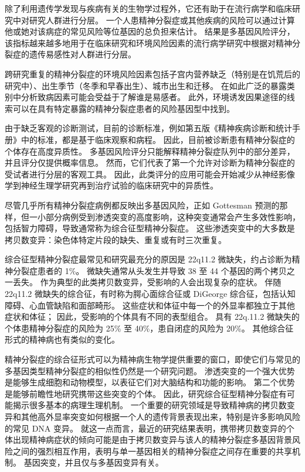 除了利用遗传学发现与疾病有关的生物学过程外，它还有助于在流行病学和临床研究中对研究人群进行分层。
一个人患精神分裂症或其他疾病的风险可以通过计算他或她对该病症的常见风险等位基因的总负担来估计。
结果是多基因风险评分，该指标越来越多地用于在临床研究和环境风险因素的流行病学研究中根据对精神分裂症的遗传易感性对人群进行分层。


跨研究重复的精神分裂症的环境风险因素包括子宫内营养缺乏（特别是在饥荒后的研究中）、出生季节（冬季和早春出生）、城市出生和迁移。
在如此广泛的暴露类别中分析致病因素可能会受益于了解谁是易感者。
此外，环境诱发因果途径的线索可以在具有特定暴露的精神分裂症患者的风险基因型中找到。


由于缺乏客观的诊断测试，目前的诊断标准，例如第五版《精神疾病诊断和统计手册》中的标准，都是基于临床观察和病程。
因此，目前被诊断患有精神分裂症的个体存在高度异质性。
多基因风险评分只能解释精神分裂症队列中的部分差异，并且评分仅提供概率信息。
然而，它们代表了第一个允许对诊断为精神分裂症的受试者进行分层的客观工具。
因此，此类评分的应用可能会开始减少从神经影像学到神经生理学研究再到治疗试验的临床研究中的异质性。


尽管几乎所有精神分裂症病例都反映出多基因风险，正如 Gottesman 预测的那样，但一小部分病例受到渗透突变的高度影响，这种突变通常会产生多效性影响，包括智力障碍，导致通常称为综合征型精神分裂症。
这些渗透突变中的大多数是拷贝数变异：染色体特定片段的缺失、重复或有时三次重复。


综合征型精神分裂症最常见和研究最充分的原因是 22q11.2 微缺失，约占诊断为精神分裂症患者的 1\%。
微缺失通常从头发生并导致 38 至 44 个基因的两个拷贝之一丢失。
作为典型的此类拷贝数变异，受影响的人会出现复杂的症状。
伴随 22q11.2 微缺失的综合征，有时称为腭心面综合征或 DiGeorge 综合征，包括认知障碍、心血管缺陷和面部畸形。
这些症状和体征中每一个的外显率都独立于其他症状和体征；
因此，受影响的个体具有不同的表型组合。
具有 22q.11.2 微缺失的个体患精神分裂症的风险为 25\% 至 40\%，患自闭症的风险为 20\%。
其他综合征形式的精神病也有类似的变化。


精神分裂症的综合征形式可以为精神病生物学提供重要的窗口，即使它们与常见的多基因类型精神分裂症的相似性仍然是一个研究问题。
渗透突变的一个强大优势是能够生成细胞和动物模型，以表征它们对大脑结构和功能的影响。
第二个优势是能够前瞻性地研究携带这些突变的个体。
因此，研究综合征型精神分裂症有可能揭示很多基本的病理生理机制。
一个重要的研究领域是导致精神病的拷贝数变异和其他高外显率突变如何根据一个人的遗传背景表现出来，特别是许多影响风险的常见 DNA 变异。
就这一点而言，最近的研究结果表明，携带拷贝数变异的个体出现精神病症状的倾向可能是由于拷贝数变异与该人的精神分裂症多基因背景风险之间的强烈相互作用，表明与单一基因相关的精神分裂症之间存在重要的共享机制。 基因突变，并且仅与多基因变异有关。



